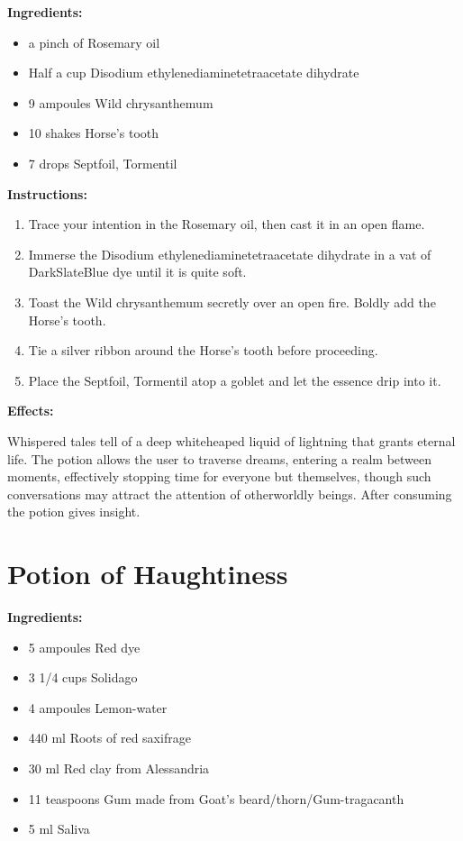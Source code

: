 \documentclass{article}
\begin{document}
\textbf{Ingredients:}

\begin{itemize}
  \item a pinch of Rosemary oil
  \item Half a cup Disodium ethylenediaminetetraacetate dihydrate
  \item 9 ampoules Wild chrysanthemum
  \item 10 shakes Horse's tooth
  \item 7 drops Septfoil, Tormentil
\end{itemize}

\textbf{Instructions:}

\begin{enumerate}
  \item Trace your intention in the Rosemary oil, then cast it in an open flame.
  \item Immerse the Disodium ethylenediaminetetraacetate dihydrate in a vat of DarkSlateBlue dye until it is quite soft.
  \item Toast the Wild chrysanthemum secretly over an open fire. Boldly add the Horse's tooth.
  \item Tie a silver ribbon around the Horse's tooth before proceeding.
  \item Place the Septfoil, Tormentil atop a goblet and let the essence drip into it.
\end{enumerate}

\textbf{Effects:}

Whispered tales tell of a deep whiteheaped liquid of lightning that grants eternal life. The potion allows the user to traverse dreams, entering a realm between moments, effectively stopping time for everyone but themselves, though such conversations may attract the attention of otherworldly beings. After consuming the potion gives insight.

\newpage
\section*{Potion of Haughtiness}

\textbf{Ingredients:}

\begin{itemize}
  \item 5 ampoules Red dye
  \item 3 1/4 cups Solidago
  \item 4 ampoules Lemon-water
  \item 440 ml Roots of red saxifrage
  \item 30 ml Red clay from Alessandria
  \item 11 teaspoons Gum made from Goat's beard/thorn/Gum-tragacanth
  \item 5 ml Saliva
\end{itemize}
\end{document}
